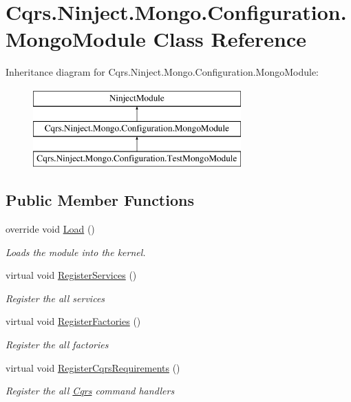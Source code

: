 \hypertarget{classCqrs_1_1Ninject_1_1Mongo_1_1Configuration_1_1MongoModule}{}\section{Cqrs.\+Ninject.\+Mongo.\+Configuration.\+Mongo\+Module Class Reference}
\label{classCqrs_1_1Ninject_1_1Mongo_1_1Configuration_1_1MongoModule}
Inheritance diagram for Cqrs.\+Ninject.\+Mongo.\+Configuration.\+Mongo\+Module\+:\begin{figure}[H]
\begin{center}
\leavevmode
\includegraphics[height=3.000000cm]{classCqrs_1_1Ninject_1_1Mongo_1_1Configuration_1_1MongoModule}
\end{center}
\end{figure}
\subsection*{Public Member Functions}
\begin{DoxyCompactItemize}
\item 
override void \hyperlink{classCqrs_1_1Ninject_1_1Mongo_1_1Configuration_1_1MongoModule_a2c1c276eb2820eede67cf834e430fa19_a2c1c276eb2820eede67cf834e430fa19}{Load} ()
\begin{DoxyCompactList}\small\item\em Loads the module into the kernel. \end{DoxyCompactList}\item 
virtual void \hyperlink{classCqrs_1_1Ninject_1_1Mongo_1_1Configuration_1_1MongoModule_a6d0edb4e718b9588671382dd2e183ebc_a6d0edb4e718b9588671382dd2e183ebc}{Register\+Services} ()
\begin{DoxyCompactList}\small\item\em Register the all services \end{DoxyCompactList}\item 
virtual void \hyperlink{classCqrs_1_1Ninject_1_1Mongo_1_1Configuration_1_1MongoModule_a052d4cd960c3c5da037a04e43424c9c8_a052d4cd960c3c5da037a04e43424c9c8}{Register\+Factories} ()
\begin{DoxyCompactList}\small\item\em Register the all factories \end{DoxyCompactList}\item 
virtual void \hyperlink{classCqrs_1_1Ninject_1_1Mongo_1_1Configuration_1_1MongoModule_a2753759a99ea08d8a0ef22ed96e52bdb_a2753759a99ea08d8a0ef22ed96e52bdb}{Register\+Cqrs\+Requirements} ()
\begin{DoxyCompactList}\small\item\em Register the all \hyperlink{namespaceCqrs}{Cqrs} command handlers \end{DoxyCompactList}\end{DoxyCompactItemize}


